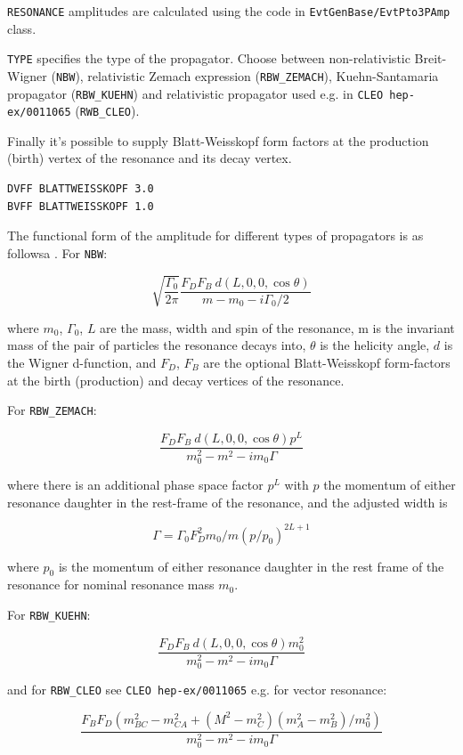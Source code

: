 \texttt{RESONANCE} amplitudes are calculated using the code in \texttt{EvtGenBase/EvtPto3PAmp} class. 

\texttt{TYPE} specifies the type of the propagator. Choose between non-relativistic
Breit-Wigner (\texttt{NBW}), relativistic Zemach expression (\texttt{RBW\_ZEMACH}),
Kuehn-Santamaria propagator (\texttt{RBW\_KUEHN}) and relativistic propagator 
used e.g. in \texttt{CLEO hep-ex/0011065} (\texttt{RWB\_CLEO}). 

Finally it's possible to supply Blatt-Weisskopf form factors at the 
production (birth) vertex of the resonance and its decay vertex.

\begin{verbatim}
DVFF BLATTWEISSKOPF 3.0
BVFF BLATTWEISSKOPF 1.0
\end{verbatim} 

The functional form of the amplitude for different types of propagators is as followsa
.
For \texttt{NBW}:

$$\sqrt{\frac{\Gamma_0}{2\pi}}\frac{F_D F_B\ d(L,0,0,\cos\theta)}{m-m_0-i\Gamma_0/2}$$

where $m_0$, $\Gamma_0$, $L$ are the mass, width and spin of the resonance, m is the invariant mass of the
pair of particles the resonance decays into, $\theta$ is the helicity angle, $d$ is the Wigner d-function, and
$F_D$, $F_B$ are the optional Blatt-Weisskopf form-factors at the birth (production) and decay vertices of the 
resonance.

For \texttt{RBW\_ZEMACH}:

$$\frac{F_D F_B\ d(L,0,0,\cos\theta) p^L}{m^2_0-m^2-im_0\Gamma}$$

where there is an additional phase space factor $p^L$ with $p$ the momentum of either resonance daughter in the 
rest-frame of the resonance, and the adjusted width is

$$\Gamma = \Gamma_0 F^2_D m_0/m (p/p_0)^{2L+1}$$

where $p_0$ is the momentum of either resonance daughter in the rest frame of the resonance for nominal resonance
mass $m_0$.

For \texttt{RBW\_KUEHN}:

$$\frac{F_D F_B\ d(L,0,0,\cos\theta) m^2_0}{m^2_0-m^2-im_0\Gamma}$$

and for \texttt{RBW\_CLEO} see \texttt{CLEO hep-ex/0011065} e.g. for vector resonance:

$$\frac{F_BF_D(m^2_{BC} - m^2_{CA} + (M^2 - m^2_C)(m^2_A - m^2_B)/m^2_0)}{m^2_0-m^2-im_0\Gamma}$$

